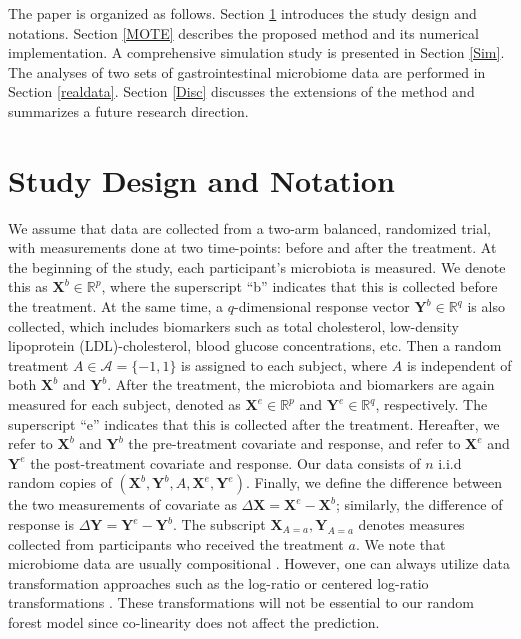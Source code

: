 \documentclass[smallextended]{svjour3}
\begin{document}
The paper is organized as follows. Section \ref{Notation} introduces the study design and notations. Section \ref{MOTE} describes the proposed method and its numerical implementation. A comprehensive simulation study is presented in Section \ref{Sim}. The analyses of two sets of gastrointestinal microbiome data are performed in Section \ref{realdata}. Section \ref{Disc} discusses the extensions of the method and summarizes a future research direction.

\section{Study Design and Notation}\label{Notation}

We assume that data are collected from a two-arm balanced, randomized trial, with measurements done at two time-points: before and after the treatment. At the beginning of the study, each participant's microbiota is measured. We denote this as $\bm{X}^b \in \mathbb{R}^p$, where the superscript ``b'' indicates that this is collected before the treatment. At the same time, a $q$-dimensional response vector $\bm{Y}^b \in \mathbb{R}^q$ is also collected, which includes biomarkers such as total cholesterol, low-density lipoprotein (LDL)-cholesterol, blood glucose concentrations, etc. Then a random treatment $A \in \mathcal{A} = \{-1,1\}$ is assigned to each subject, where $A$ is independent of both $\bm{X}^b$ and $\bm{Y}^b$. After the treatment, the microbiota and biomarkers are again measured for each subject, denoted as $\bm X^e \in \mathbb{R}^p$ and $\bm Y^e \in \mathbb{R}^q$, respectively. The superscript ``e'' indicates that this is collected after the treatment. Hereafter, we refer to $\bm X^b$ and $\bm Y^b$ the pre-treatment covariate and response, and refer to $\bm X^e$ and $\bm Y^e$ the post-treatment covariate and response. Our data consists of $n$ i.i.d random copies of $(\bm X^b, \bm Y^b, A, \bm X^e, \bm Y^e)$. Finally, we define the difference between the two measurements of covariate as $\Delta \bm X = \bm X^e - \bm X^b$; similarly, the difference of response is $\Delta \bm Y = \bm Y^e - \bm Y^b$. The subscript $ \textbf{X}_{A=a}, \textbf{Y}_{A=a}$ denotes measures collected from participants who received the treatment $a$. We note that microbiome data are usually compositional \citep{li2019statistical}. However, one can always utilize data transformation approaches such as the log-ratio or centered log-ratio transformations \citep{egozcue2003isometric}. These transformations will not be essential to our random forest model since co-linearity does not affect the prediction.
\end{document}
